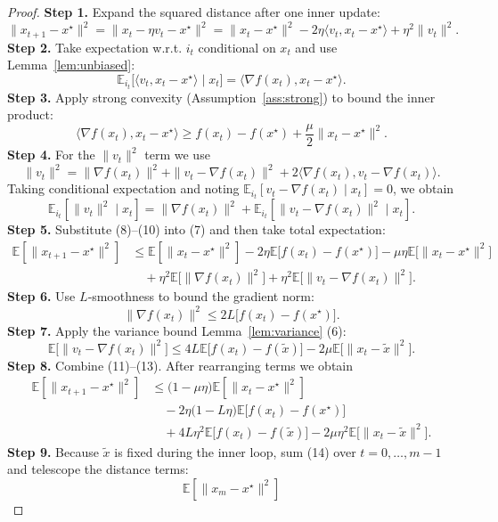 \documentclass{article}
\newcommand{\E}{\mathbb{E}}
\begin{document}
\begin{proof}
\textbf{Step 1.} Expand the squared distance after one inner update:
\[
\|x_{t+1}-x^{\star}\|^2
= \|x_t-\eta v_t-x^{\star}\|^2
= \|x_t-x^{\star}\|^2-2\eta\langle v_t,x_t-x^{\star}\rangle+\eta^2\|v_t\|^2.
\tag{7}
\]
\textbf{Step 2.} Take expectation w.r.t. $i_t$ conditional on $x_t$ and use Lemma~\ref{lem:unbiased}:
\[
\E_{i_t}\bigl[\langle v_t,x_t-x^{\star}\rangle\mid x_t\bigr]
= \langle\nabla f(x_t),x_t-x^{\star}\rangle .
\tag{8}
\]
\textbf{Step 3.} Apply strong convexity (Assumption~\ref{ass:strong}) to bound the inner product:
\[
\langle\nabla f(x_t),x_t-x^{\star}\rangle
\ge f(x_t)-f(x^{\star})+\frac{\mu}{2}\|x_t-x^{\star}\|^2 .
\tag{9}
\]
\textbf{Step 4.} For the $\|v_t\|^2$ term we use
\[
\|v_t\|^2 = \|\nabla f(x_t)\|^2
+ \|v_t-\nabla f(x_t)\|^2
+2\langle\nabla f(x_t),v_t-\nabla f(x_t)\rangle .
\]
Taking conditional expectation and noting $\E_{i_t}[v_t-\nabla f(x_t)\mid x_t]=0$, we obtain
\[
\E_{i_t}[\|v_t\|^2\mid x_t]=\|\nabla f(x_t)\|^2+\E_{i_t}[\|v_t-\nabla f(x_t)\|^2\mid x_t].
\tag{10}
\]
\textbf{Step 5.} Substitute (8)–(10) into (7) and then take total expectation:
\[
\begin{aligned}
\E[\|x_{t+1}-x^{\star}\|^2]
&\le \E[\|x_t-x^{\star}\|^2]
-2\eta\E\!\bigl[f(x_t)-f(x^{\star})\bigr]
-\mu\eta\E\!\bigl[\|x_t-x^{\star}\|^2\bigr]   \\
&\quad +\eta^2\E\!\bigl[\|\nabla f(x_t)\|^2\bigr]
+\eta^2\E\!\bigl[\|v_t-\nabla f(x_t)\|^2\bigr].
\end{aligned}
\tag{11}
\]
\textbf{Step 6.} Use $L$‑smoothness to bound the gradient norm:
\[
\|\nabla f(x_t)\|^2 \le 2L\bigl[f(x_t)-f(x^{\star})\bigr].
\tag{12}
\]
\textbf{Step 7.} Apply the variance bound Lemma~\ref{lem:variance} (6):
\[
\E\!\bigl[\|v_t-\nabla f(x_t)\|^2\bigr]
\le 4L\E\!\bigl[f(x_t)-f(\tilde{x})\bigr]
-2\mu\E\!\bigl[\|x_t-\tilde{x}\|^2\bigr].
\tag{13}
\]
\textbf{Step 8.} Combine (11)–(13). After rearranging terms we obtain
\[
\begin{aligned}
\E[\|x_{t+1}-x^{\star}\|^2]
&\le \bigl(1-\mu\eta\bigr)\E[\|x_t-x^{\star}\|^2]  \\
&\quad -2\eta\bigl(1-L\eta\bigr)\E\!\bigl[f(x_t)-f(x^{\star})\bigr]   \\
&\quad +4L\eta^{2}\E\!\bigl[f(x_t)-f(\tilde{x})\bigr]
-2\mu\eta^{2}\E\!\bigl[\|x_t-\tilde{x}\|^2\bigr].
\end{aligned}
\tag{14}
\]
\textbf{Step 9.} Because $\tilde{x}$ is fixed during the inner loop, sum (14) over $t=0,\dots,m-1$ and telescope the distance terms:
\[
\E[\|x_{m}-x^{\star}\|^2]
\]
\end{proof}
\end{document}
